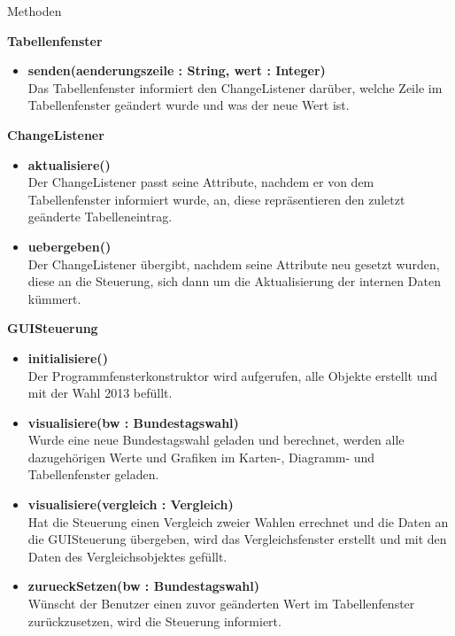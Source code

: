 \documentclass[10pt,a4paper]{article}
\begin{document}
\newpage
\begin{large}
Methoden 
\end{large}
\begin{description}
\item \textbf {Tabellenfenster} \\
\begin{itemize}
\item \textbf {senden(aenderungszeile : String, wert : Integer)} \\
Das Tabellenfenster informiert den ChangeListener darüber, welche Zeile im Tabellenfenster
geändert  wurde und was der neue Wert ist. \\
\end{itemize}
\item \textbf {ChangeListener} \\
\begin{itemize}
\item \textbf {aktualisiere()} \\
Der ChangeListener passt seine Attribute, nachdem er von dem Tabellenfenster informiert wurde, an,
diese repräsentieren den zuletzt geänderte Tabelleneintrag. \\
\item \textbf {uebergeben()} \\
Der ChangeListener übergibt, nachdem seine Attribute neu gesetzt wurden, diese an die Steuerung,
sich dann um die Aktualisierung der internen Daten kümmert. \\
\end{itemize} 
\item \textbf {GUISteuerung} \\
\begin{itemize}
\item \textbf {initialisiere()} \\
Der Programmfensterkonstruktor wird aufgerufen, alle Objekte erstellt und mit der Wahl 2013 befüllt. \\
\item \textbf {visualisiere(bw : Bundestagswahl)} \\
Wurde eine neue Bundestagswahl geladen und berechnet, werden alle dazugehörigen Werte und Grafiken
im Karten-, Diagramm- und Tabellenfenster geladen. \\ 
\item \textbf {visualisiere(vergleich : Vergleich)} \\
Hat die Steuerung einen Vergleich zweier Wahlen errechnet und die Daten an die GUISteuerung übergeben,
wird das Vergleichsfenster erstellt und mit den Daten des Vergleichsobjektes gefüllt. \\
\item \textbf {zurueckSetzen(bw : Bundestagswahl)} \\
Wünscht der Benutzer einen zuvor geänderten Wert im Tabellenfenster zurückzusetzen, wird die Steuerung 
informiert. \\
\end{itemize}

\end{description}
\end{document}
